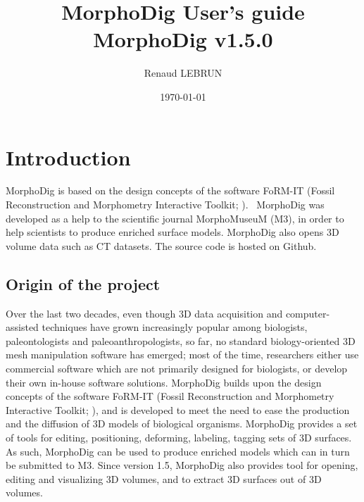 \documentclass[12pt, a4paper]{book}
\title{MorphoDig User's guide\\MorphoDig v1.5.0}
\author{Renaud LEBRUN}
\affil{Institut des Sciences de l'Evolution, University of Montpellier, France}
\date{\today}
\begin{document}
	\dominitoc

\maketitle


\tableofcontents

\chapter*{Introduction}


\minitoc 

 MorphoDig is based on the design concepts of the software FoRM-IT (Fossil Reconstruction and Morphometry Interactive Toolkit; \citep{Zollikofer1995,Zollikofer2005}).
\ MorphoDig\citep{Lebrun2018} was developed as a help to the scientific journal MorphoMuseuM (M3), in order to help scientists to produce enriched surface models.  MorphoDig also opens 3D volume data such as CT datasets. The source code is hosted on Github.   
\section*{Origin of the project}
Over the last two decades, even though 3D data acquisition and computer-assisted techniques have grown increasingly popular among biologists, paleontologists and paleoanthropologists, so far, no standard biology-oriented 3D mesh manipulation software has emerged; most of the time, researchers either use commercial software which are not primarily designed for biologists, or develop their own in-house software solutions.  MorphoDig builds upon the design concepts of the software FoRM-IT (Fossil Reconstruction and Morphometry Interactive Toolkit; \citep{Zollikofer1995,Zollikofer2005}), and is developed to meet the need to ease the production and the diffusion of 3D models of biological organisms. MorphoDig provides a set of tools for editing, positioning, deforming, labeling, tagging sets of 3D surfaces.  As such, MorphoDig can be used to produce enriched models which can in turn be submitted to M3. Since version 1.5, MorphoDig also provides tool for opening, editing and visualizing 3D volumes, and to extract 3D surfaces out of 3D volumes. 
\end{document}
